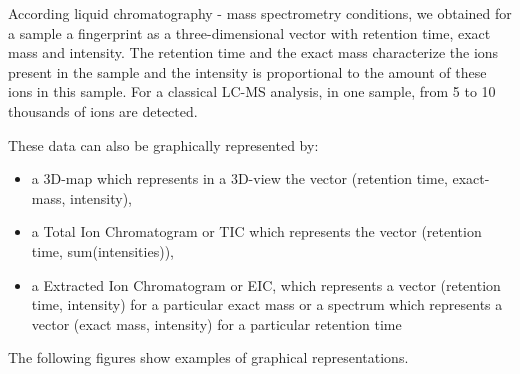 \hspace*{\parindent}
According liquid chromatography - mass spectrometry conditions, we obtained for a sample a fingerprint  as a three-dimensional vector with retention time, exact mass and intensity. The retention time and the exact mass characterize the ions present in the sample and the intensity is proportional to the amount of these ions in this sample. For a classical LC-MS analysis, in one sample, from 5 to 10 thousands of ions are detected.

These data can also be graphically represented by:

\begin{itemize}
	\item a 3D-map which represents in a 3D-view the vector (retention time, exact-mass, intensity),
	\item a  Total Ion Chromatogram or TIC which represents the vector (retention time, sum(intensities)),
	\item a  Extracted Ion Chromatogram or EIC, which represents a vector (retention time, intensity) for a particular exact mass or a spectrum which represents a vector (exact mass, intensity) for a particular retention time
\end{itemize}

The following figures show examples of graphical representations.


